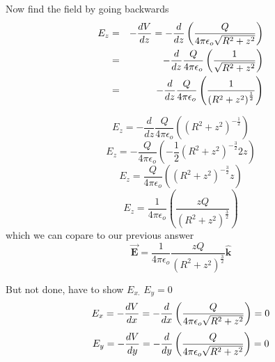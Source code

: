 \documentclass{article}
\begin{document}
Now find the field by going backwards%
\begin{eqnarray*}
E_{z} &=&-\frac{dV}{dz}=-\frac{d}{dz}\left( \frac{Q}{4\pi \epsilon _{o}\sqrt{%
R^{2}+z^{2}}}\right)  \\
&=&-\frac{d}{dz}\frac{Q}{4\pi \epsilon _{o}}\left( \frac{1}{\sqrt{R^{2}+z^{2}%
}}\right)  \\
&=&-\frac{d}{dz}\frac{Q}{4\pi \epsilon _{o}}\left( \frac{1}{\left(
R^{2}+z^{2}\right) ^{\frac{1}{2}}}\right) 
\end{eqnarray*}

\[
E_{z}=-\frac{d}{dz}\frac{Q}{4\pi \epsilon _{o}}\left( \left(
R^{2}+z^{2}\right) ^{-\frac{1}{2}}\right) 
\]%
\[
E_{z}=-\frac{Q}{4\pi \epsilon _{o}}\left( -\frac{1}{2}\left(
R^{2}+z^{2}\right) ^{-\frac{3}{2}}2z\right) 
\]%
\[
E_{z}=\frac{Q}{4\pi \epsilon _{o}}\left( \left( R^{2}+z^{2}\right) ^{-\frac{3%
}{2}}z\right) 
\]%
\[
E_{z}=\frac{1}{4\pi \epsilon _{o}}\left( \frac{zQ}{\left( R^{2}+z^{2}\right)
^{\frac{3}{2}}}\right) 
\]%
which we can copare to our previous answer%
\[
\overrightarrow{\mathbf{E}}=\frac{1}{4\pi \epsilon _{o}}\frac{zQ}{\left(
R^{2}+z^{2}\right) ^{\frac{3}{2}}}\mathbf{\hat{k}}
\]

\bigskip 

But not done, have to show $E_{x.}$ $E_{y}=0$%
\[
E_{x}=-\frac{dV}{dx}=-\frac{d}{dx}\left( \frac{Q}{4\pi \epsilon _{o}\sqrt{%
R^{2}+z^{2}}}\right) =0
\]%
\[
E_{y}=-\frac{dV}{dy}=-\frac{d}{dy}\left( \frac{Q}{4\pi \epsilon _{o}\sqrt{%
R^{2}+z^{2}}}\right) =0
\]
\end{document}
